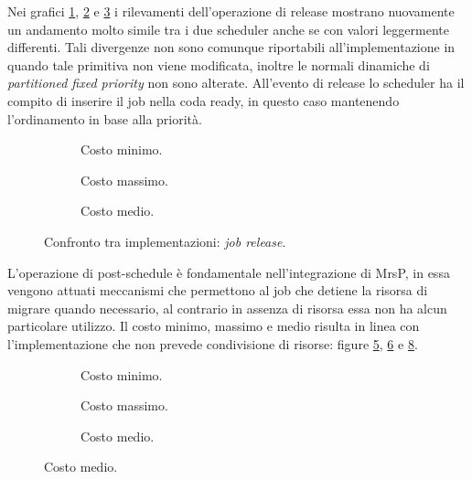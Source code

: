 {\noindent Nei grafici \ref{fig:releaseMin}, \ref{fig:releaseMax} e \ref{fig:releaseAvg} i rilevamenti dell'operazione di release mostrano nuovamente un andamento molto simile tra i due scheduler anche se con valori leggermente differenti. Tali divergenze non sono comunque riportabili all'implementazione in quando tale primitiva non viene modificata, inoltre le normali dinamiche di \textit{partitioned fixed priority} non sono alterate. All'evento di release lo scheduler ha il compito di inserire il job nella coda ready, in questo caso mantenendo l'ordinamento in base alla priorità.\\

  \begin{figure}[htb]
    \centering
      \begin{subfigure}[b]{0.49\textwidth}
        \centering
        \resizebox{\linewidth}{!}\graficoReleaseMIN  
        \caption{Costo minimo.}
        \label{fig:releaseMin}
      \end{subfigure}
      \begin{subfigure}[b]{0.49\textwidth}
        \centering
        \resizebox{\linewidth}{!}\graficoReleaseMAX
        \caption{Costo massimo.}
        \label{fig:releaseMax}
      \end{subfigure}
      \begin{subfigure}[b]{0.49\textwidth}
        \centering
        \resizebox{\linewidth}{!}\graficoReleaseAVG
        \caption{Costo medio.}
        \label{fig:releaseAvg}
      \end{subfigure}

    \caption{Confronto tra implementazioni: \textit{job release}.}
    \label{fig:release}
  \end{figure}
        
\noindent L'operazione di post-schedule è fondamentale nell'integrazione di MrsP, in essa vengono attuati meccanismi che permettono al job che detiene la risorsa di migrare quando necessario, al contrario in assenza di risorsa essa non ha alcun particolare utilizzo. Il costo minimo, massimo e medio risulta in linea con l'implementazione che non prevede condivisione di risorse: figure \ref{fig:cxsMin}, \ref{fig:cxsMax} e \ref{fig:cxsAvg}.\\

  \begin{figure}[htb]
    \centering
      \begin{subfigure}[b]{0.49\textwidth}
        \centering
        \resizebox{\linewidth}{!}\graficoCxsMIN  
        \caption{Costo minimo.}
        \label{fig:cxsMin}
      \end{subfigure}
      \begin{subfigure}[b]{0.49\textwidth}
        \centering
        \resizebox{\linewidth}{!}\graficoCxsMAX
        \caption{Costo massimo.}
        \label{fig:cxsMax}
      \end{subfigure}
      \begin{subfigure}[b]{0.49\textwidth}
        \centering
        \resizebox{\linewidth}{!}\graficoCxsAVG
        \caption{Costo medio.}
        \label{fig:cxsAvg}
      \end{subfigure}


\end{figure}}

